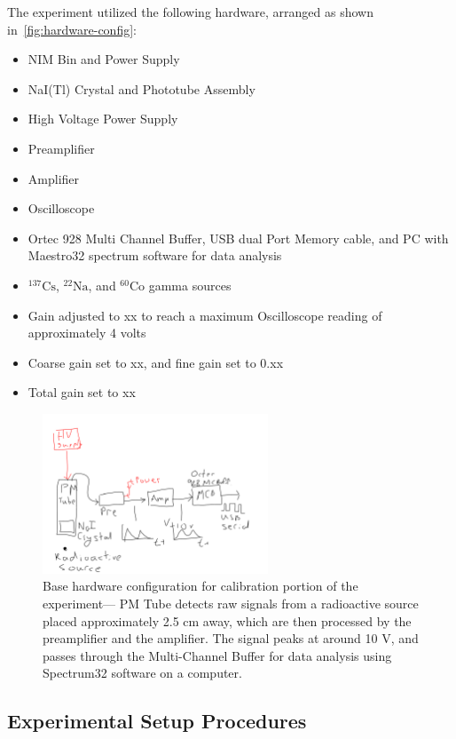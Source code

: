 \documentclass[a4paper]{article}
\begin{document}
The experiment utilized the following hardware, arranged as shown in~\autoref{fig:hardware-config}:
\begin{itemize}
\item NIM Bin and Power Supply
\item NaI(Tl) Crystal and Phototube Assembly
\item High Voltage Power Supply
\item Preamplifier
\item Amplifier
\item Oscilloscope
\item Ortec 928 Multi Channel Buffer, USB dual Port Memory cable, and PC with Maestro32 spectrum software for data analysis
\item $^{137}\mathrm{Cs}$, $^{22}\mathrm{Na}$, and $^{60}\mathrm{Co}$ gamma sources
\item Gain adjusted to xx to reach a maximum Oscilloscope reading of approximately 4 volts
\item Coarse gain set to xx, and fine gain set to 0.xx
\item Total gain set to xx
\end{itemize}

\begin{figure}[H]
\centering
\includegraphics[width=0.6\textwidth]{figures/experiment-setup.pdf}
\caption{Base hardware configuration for calibration portion of the experiment--- PM Tube detects raw signals from a radioactive source placed approximately 2.5 cm away, which are then processed by the preamplifier and the amplifier. The signal peaks at around 10 V, and passes through the Multi-Channel Buffer for data analysis using Spectrum32 software on a computer.}
\label{fig:hardware-config}
\end{figure}

\subsection{Experimental Setup Procedures}
\end{document}
